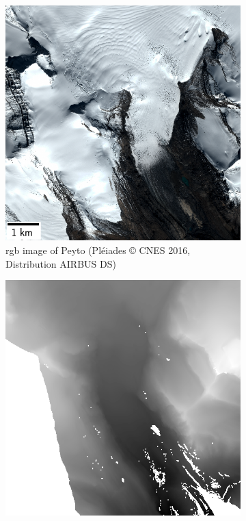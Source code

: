 \begin{figure}
    \centering
    \begin{subfigure}[t]{0.48\linewidth}
        \flushleft
        \includegraphics[width=\linewidth]{Images/Chap_6/miniature_Peyto.png}
        \caption{\acrshort{rgb} image of Peyto (Pléiades © CNES 2016, Distribution AIRBUS DS)}
        \label{fig:miniature_Peyto_rgb}
    \end{subfigure}\hfill
    \begin{subfigure}[t]{0.48\linewidth}
        \flushright
        \includegraphics[width=\linewidth]{Images/Chap_6/miniature_Peyto_gt.png}

\end{subfigure}
\end{figure}
